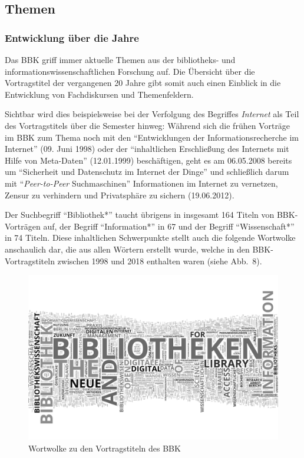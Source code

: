 \documentclass[a4paper,
fontsize=11pt,
oneside,
numbers=noperiodatend,
parskip=half-,
bibliography=totoc,
final
]{scrartcl}
\begin{document}
\hypertarget{themen}{%
\subsection{Themen}\label{themen}}

\hypertarget{entwicklung-uxfcber-die-jahre}{%
\subsubsection{Entwicklung über die
Jahre}\label{entwicklung-uxfcber-die-jahre}}

Das BBK griff immer aktuelle Themen aus der bibliotheks- und
informationswissenschaftlichen Forschung auf. Die Übersicht über die
Vortragstitel der vergangenen 20 Jahre gibt somit auch einen Einblick in
die Entwicklung von Fachdiskursen und Themenfeldern.

Sichtbar wird dies beispielsweise bei der Verfolgung des Begriffes
\emph{Internet} als Teil des Vortragstitels über die Semester hinweg:
Während sich die frühen Vorträge im BBK zum Thema noch mit den
\enquote{Entwicklungen der Informationsrecherche im Internet} (09. Juni
1998) oder der \enquote{inhaltlichen Erschließung des Internets mit
Hilfe von Meta-Daten} (12.01.1999) beschäftigen, geht es am 06.05.2008
bereits um \enquote{Sicherheit und Datenschutz im Internet der Dinge}
und schließlich darum mit \enquote{\emph{Peer-to-Peer} Suchmaschinen}
Informationen im Internet zu vernetzen, Zensur zu verhindern und
Privatsphäre zu sichern (19.06.2012).

Der Suchbegriff \enquote{Bibliothek*} taucht übrigens in insgesamt 164
Titeln von BBK-Vorträgen auf, der Begriff \enquote{Information*} in 67
und der Begriff \enquote{Wissenschaft*} in 74 Titeln. Diese inhaltlichen
Schwerpunkte stellt auch die folgende Wortwolke anschaulich dar, die aus
allen Wörtern erstellt wurde, welche in den BBK-Vortragstiteln zwischen
1998 und 2018 enthalten waren (siehe Abb.~8).

\begin{figure}[h!]
\centering
\includegraphics[width=15cm]{img/Abbildung8.png}
\caption{Wortwolke zu den Vortragstiteln des BBK}
\end{figure}
\end{document}
